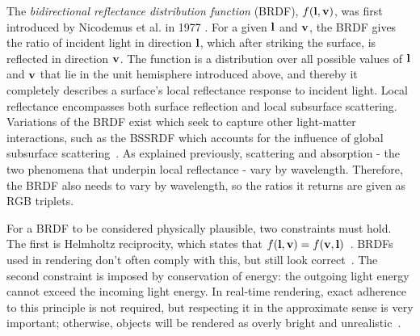 The \textit{bidirectional reflectance distribution function} (BRDF), \begin{math}f(\mathbf{l}, \mathbf{v})\end{math}, was first introduced by Nicodemus et al. in 1977 \cite{OriginalBRDF}. For a given \begin{math}\mathbf{l}\end{math} and \begin{math}\mathbf{v}\end{math}, the BRDF gives the ratio of incident light in direction \begin{math}\mathbf{l}\end{math}, which after striking the surface, is reflected in direction \begin{math}\mathbf{v}\end{math}. The function is a distribution over all possible values of \begin{math}\mathbf{l}\end{math} and \begin{math}\mathbf{v}\end{math} that lie in the unit hemisphere introduced above, and thereby it completely describes a surface's local reflectance response to incident light. Local reflectance encompasses both surface reflection and local subsurface scattering. Variations of the BRDF exist which seek to capture other light-matter interactions, such as the BSSRDF which accounts for the influence of global subsurface scattering~\cite{PracticalModelForSubsurfaceLightTransport}. As explained previously, scattering and absorption - the two phenomena that underpin local reflectance - vary by wavelength. Therefore, the BRDF also needs to vary by wavelength, so the ratios it returns are given as RGB triplets.

For a BRDF to be considered physically plausible, two constraints must hold. The first is Helmholtz reciprocity, which states that \begin{math}f(\mathbf{l}, \mathbf{v}) = f(\mathbf{v}, \mathbf{l})\end{math}~\cite{HelmholtzReciprocity}. BRDFs used in rendering don't often comply with this, but still look correct~\cite{RTR4}. The second constraint is imposed by conservation of energy: the outgoing light energy cannot exceed the incoming light energy. In real-time rendering, exact adherence to this principle is not required, but respecting it in the approximate sense is very important; otherwise, objects will be rendered as overly bright and unrealistic~\cite{RTR4, MovingFrostbitetoPBR}.

